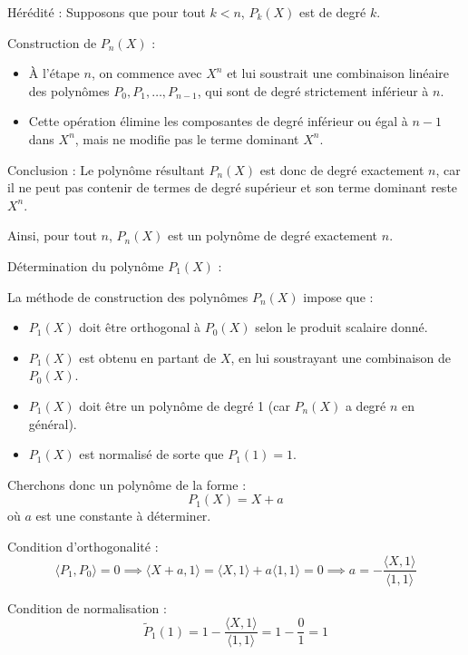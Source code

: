 \documentclass[10pt,a4paper]{article}
\begin{document}
Hérédité : Supposons que pour tout \( k < n \), \( P_k(X) \) est de degré \( k \).

Construction de \( P_n(X) \) :
\begin{itemize}
    \item À l'étape \( n \), on commence avec \( X^n \) et lui soustrait une combinaison linéaire
    des polynômes \( P_0, P_1, \dots, P_{n-1} \), qui sont de degré strictement inférieur à \( n \).
    \item Cette opération élimine les composantes de degré inférieur ou égal à \( n-1 \) dans \( X^n
    \), mais ne modifie pas le terme dominant \( X^n \).
\end{itemize}

Conclusion : Le polynôme résultant \( P_n(X) \) est donc de degré exactement \( n \), car il ne peut
pas contenir de termes de degré supérieur et son terme dominant reste \( X^n \).

Ainsi, pour tout \( n \), \( P_n(X) \) est un polynôme de degré exactement \( n \).


\q Détermination du polynôme \( P_1(X) \) :

La méthode de construction des polynômes \( P_n(X) \) impose que :
\begin{itemize}
    \item \( P_1(X) \) doit être orthogonal à \( P_0(X) \) selon le produit scalaire donné.
    \item \( P_1(X) \) est obtenu en partant de \( X \), en lui soustrayant une combinaison de \(
    P_0(X) \).
    \item \( P_1(X) \) doit être un polynôme de degré 1 (car \( P_n(X) \) a degré \( n \) en
    général).
    \item \( P_1(X) \) est normalisé de sorte que \( P_1(1) = 1 \).
\end{itemize}

Cherchons donc un polynôme de la forme :
\[
P_1(X) = X + a
\]
où \( a \) est une constante à déterminer.

Condition d'orthogonalité :
\[
\langle P_1, P_0 \rangle = 0
\implies
\langle X + a, 1 \rangle = \langle X, 1 \rangle + a \langle 1, 1 \rangle = 0
\implies
a = - \frac{\langle X, 1 \rangle}{\langle 1, 1 \rangle}
\]

Condition de normalisation :
\[
 \tilde P_1(1) = 1 - \frac{\langle X, 1 \rangle}{\langle 1, 1 \rangle} = 1 - \frac{0}{1} = 1
\]
\end{document}
